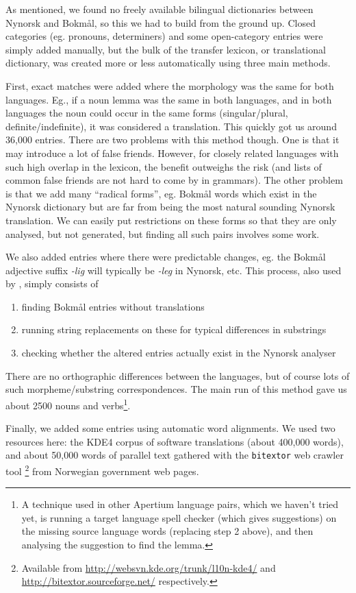 \documentclass[11pt]{article}
\begin{document}
As mentioned, we found no freely available bilingual dictionaries
between Nynorsk and Bokmål, so this we had to build from the ground
up. Closed categories (eg. pronouns, determiners) and some
open-category entries were simply added manually, but the bulk of the
transfer lexicon, or translational dictionary, was created more or
less automatically using three main methods.

First, exact matches were added where the morphology was the same for
both languages. Eg., if a noun lemma was the same in both languages,
and in both languages the noun could occur in the same forms
(singular/plural, definite/indefinite), it was considered a
translation. This quickly got us around 36,000 entries. There are two
problems with this method though. One is that it may introduce a lot
of false friends. However, for closely related languages with such
high overlap in the lexicon, the benefit outweighs the risk (and lists
of common false friends are not hard to come by in grammars). The
other problem is that we add many ``radical forms'', eg. Bokmål words
which exist in the Nynorsk dictionary but are far from being the most
natural sounding Nynorsk translation. We can easily put restrictions
on these forms so that they are only analysed, but not generated, but
finding all such pairs involves some work.

We also added entries where there were predictable changes, eg. the
Bokmål adjective suffix \emph{-lig} will typically be \emph{-leg} in Nynorsk,
etc. This process, also used by \citet[p.~4]{tyers2009dpm},
simply consists of
\begin{enumerate}
\item finding Bokmål entries without translations \item running string replacements on these for typical differences in
   substrings
\item checking whether the altered entries actually exist in the Nynorsk
   analyser
\end{enumerate}
There are no orthographic differences between the languages, but of
course lots of such morpheme/substring correspondences. The main run
of this method gave us about 2500 nouns and verbs\footnote{A technique
  used in other Apertium language pairs, which we haven't tried yet,
  is running a target language spell checker (which gives suggestions)
  on the missing source language words (replacing step 2 above), and
  then analysing the suggestion to find the lemma. }.

Finally, we added some entries using automatic word alignments. We
used two resources here: the KDE4 corpus of software translations
(about 400,000 words), and about 50,000 words of parallel text
gathered with the {\tt bitextor} web crawler tool
\citep{espla-gomis2009bfs}\footnote{Available
  from
  \href{http://websvn.kde.org/trunk/l10n-kde4/}{http://websvn.kde.org/trunk/l10n-kde4/}
  and
  \href{http://bitextor.sourceforge.net/}{http://bitextor.sourceforge.net/}
  respectively.} from Norwegian government web pages.
\end{document}
